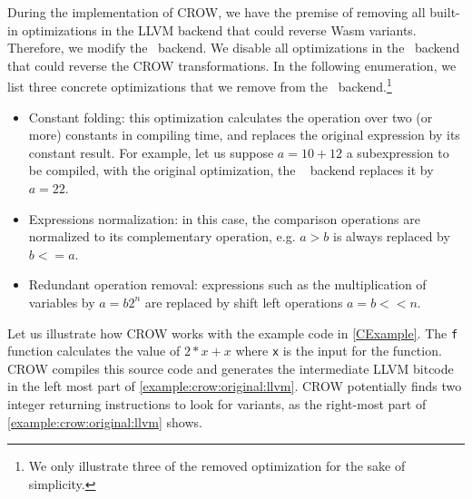 
During the implementation of CROW, we have the premise of removing all built-in optimizations in the LLVM backend that could reverse Wasm variants.
Therefore, we modify the \wasm\ backend.
We disable all optimizations in the \wasm\ backend that could reverse the CROW transformations.
In the following enumeration, we list three concrete optimizations that we remove from the \wasm~backend.\footnote{
We only illustrate three of the removed optimization for the sake of simplicity.}

\begin{itemize}
    \item Constant folding: this optimization calculates the operation over two (or more) constants in compiling time, and replaces the original expression by its constant result. For example, let us suppose \texttt{$a = 10 + 12$} a subexpression to be compiled, with the original optimization, the \wasm~ backend replaces it by \texttt{$a = 22$}.
    
    \item Expressions normalization: in this case, the comparison operations are normalized to its complementary operation, e.g. \texttt{$a > b$} is always replaced by \texttt{$b <= a$}.
    
    \item Redundant operation removal: expressions such as the multiplication of variables by \texttt{$a = b2^n$} are replaced by shift left operations \texttt{$a = b << n$}.  
\end{itemize}


\label{section:crow:example}

Let us illustrate how CROW works with the example code in \autoref{CExample}. The \texttt{f} function calculates the value of $2 * x + x$ where \texttt{x} is the input for the function.  CROW compiles this source code and generates the intermediate LLVM bitcode in the left most part of \autoref{example:crow:original:llvm}. CROW potentially finds two integer returning instructions to look for variants, as the right-most part of \autoref{example:crow:original:llvm} shows.

